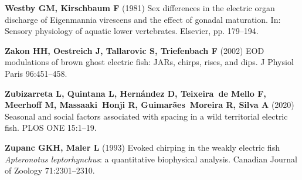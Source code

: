 \documentclass[vruler,JEB]{COB}%
\begin{document}
\begin{thebibliography}{70}
\textbf{Westby GM, Kirschbaum F} (1981) Sex differences in the electric organ discharge
  of Eigenmannia virescens and the effect of gonadal maturation.
 In: Sensory physiology of aquatic lower vertebrates. Elsevier, pp.
  179--194.

\textbf{Zakon HH, Oestreich J, Tallarovic S, Triefenbach F} (2002) EOD modulations of
  brown ghost electric fish: JARs, chirps, rises, and dips.
 J Physiol Paris 96:451--458.

\textbf{Zubizarreta L, Quintana L, Hernández D, Teixeira~de Mello F, Meerhoff M,
  Massaaki~Honji R, Guimarães~Moreira R, Silva A} (2020) Seasonal and social
  factors associated with spacing in a wild territorial electric fish.
 PLOS ONE 15:1--19.

\textbf{Zupanc GKH, Maler L} (1993) Evoked chirping in the weakly electric fish
  \textit{Apteronotus leptorhynchus}: a quantitative biophysical analysis.
 Canadian Journal of Zoology 71:2301--2310.
\end{thebibliography}


\clearpage

\renewcommand\thefigure{\thesection S\arabic{figure}}
\setcounter{figure}{0}   

\pagestyle{empty}

\begin{figure}[!ht]
  \caption{\label{fishsetup}}
\end{figure}

\begin{figure}[!ht]
  \caption{\label{eodf}}
\end{figure}

\begin{figure}[!htp]
  \caption{\label{glm}}
\end{figure}
\end{document}

